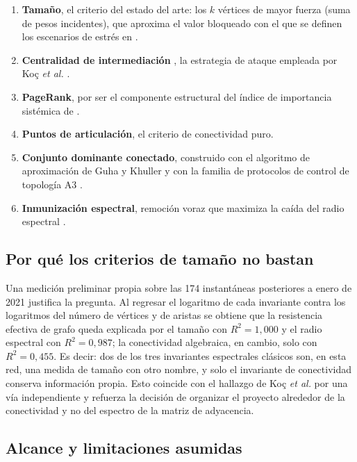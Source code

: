 \documentclass[journal]{IEEEtran}
\begin{document}
\begin{enumerate}
\item \textbf{Tamaño}, el criterio del estado del arte: los $k$ vértices de mayor
      fuerza (suma de pesos incidentes), que aproxima el valor bloqueado con el
      que se definen los escenarios de estrés en \cite{shu2026dexposurefm}.
\item \textbf{Centralidad de intermediación} \cite{freeman1977betweenness}, la
      estrategia de ataque empleada por Koç \emph{et al.}
      \cite{koc2014topological}.
\item \textbf{PageRank}, por ser el componente estructural del índice de
      importancia sistémica de \cite{shu2026dexposurefm}.
\item \textbf{Puntos de articulación}, el criterio de conectividad puro.
\item \textbf{Conjunto dominante conectado}, construido con el algoritmo de
      aproximación de Guha y Khuller \cite{guha1998approximation} y con la
      familia de protocolos de control de topología A3
      \cite{wightman2008a3,wightman2010topology}.
\item \textbf{Inmunización espectral}, remoción voraz que maximiza la caída del
      radio espectral \cite{chen2016node}.
\end{enumerate}

\subsection{Por qué los criterios de tamaño no bastan}

Una medición preliminar propia sobre las 174 instantáneas posteriores a enero de
2021 justifica la pregunta. Al regresar el logaritmo de cada invariante contra los
logaritmos del número de vértices y de aristas se obtiene que la resistencia
efectiva de grafo queda explicada por el tamaño con $R^2 = 1{,}000$ y el radio
espectral con $R^2 = 0{,}987$; la conectividad algebraica, en cambio, solo con
$R^2 = 0{,}455$. Es decir: dos de los tres invariantes espectrales clásicos son,
en esta red, una medida de tamaño con otro nombre, y solo el invariante de
conectividad conserva información propia. Esto coincide con el hallazgo de Koç
\emph{et al.} \cite{koc2014topological} por una vía independiente y refuerza la
decisión de organizar el proyecto alrededor de la conectividad y no del espectro
de la matriz de adyacencia.

\subsection{Alcance y limitaciones asumidas}
\end{document}
